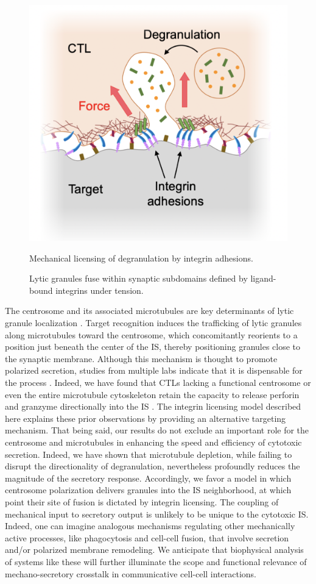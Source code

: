 \begin{figure}[htbp]
	\centering
	\includegraphics[width=0.7\columnwidth]{../figures/chapter3/discintegrinmodel.png}
	\caption{Mechanical licensing of degranulation by integrin adhesions.}
	\caption*{Lytic granules fuse within synaptic subdomains defined by ligand-bound integrins under tension.}
	\label{fig:discintegrinmodel}
\end{figure}

The centrosome and its associated microtubules are key determinants of lytic granule localization \cite{Stinchcombe2007, Huse2013}. Target recognition induces the trafficking of lytic granules along microtubules toward the centrosome, which concomitantly reorients to a position just beneath the center of the IS, thereby positioning granules close to the synaptic membrane. Although this mechanism is thought to promote polarized secretion, studies from multiple labs indicate that it is dispensable for the process \cite{Tamzalit2020, Bertrand2013, Butler2009}. Indeed, we have found that CTLs lacking a functional centrosome or even the entire microtubule cytoskeleton retain the capacity to release perforin and granzyme directionally into the IS \cite{Tamzalit2020}. The integrin licensing model described here explains these prior observations by providing an alternative targeting mechanism. That being said, our results do not exclude an important role for the centrosome and microtubules in enhancing the speed and efficiency of cytotoxic secretion. Indeed, we have shown that microtubule depletion, while failing to disrupt the directionality of degranulation, nevertheless profoundly reduces the magnitude of the secretory response. Accordingly, we favor a model in which centrosome polarization delivers granules into the IS neighborhood, at which point their site of fusion is dictated by integrin licensing. The coupling of mechanical input to secretory output is unlikely to be unique to the cytotoxic IS. Indeed, one can imagine analogous mechanisms regulating other mechanically active processes, like phagocytosis and cell-cell fusion, that involve secretion and/or polarized membrane remodeling. We anticipate that biophysical analysis of systems like these will further illuminate the scope and functional relevance of mechano-secretory crosstalk in communicative cell-cell interactions.

